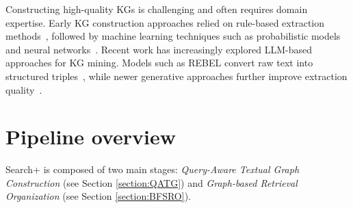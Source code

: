 \documentclass[11pt]{article}
\begin{document}
Constructing high-quality KGs is challenging and often requires domain expertise. Early KG construction approaches relied on rule-based extraction methods~\cite{DBLP:conf/coling/Hearst92}, followed by machine learning techniques such as probabilistic models and neural networks~\cite{DBLP:conf/wsdm/Pujara018}. Recent work has increasingly explored LLM-based approaches for KG mining. Models such as REBEL convert raw text into structured triples~\cite{DBLP:conf/emnlp/CabotN21}, while newer generative approaches further improve extraction quality~\cite{DBLP:conf/vldb/NieHSWJZZS24,DBLP:conf/vldb/MouLSCD24,DBLP:conf/nana/SunZH24}. 

\section{Pipeline overview}\label{Pipeline}
Search+ is composed of two main stages: \emph{Query-Aware Textual Graph Construction} (see Section \ref{section:QATG}) and \emph{Graph-based Retrieval Organization} (see Section \ref{section:BFSRO}).
\end{document}
